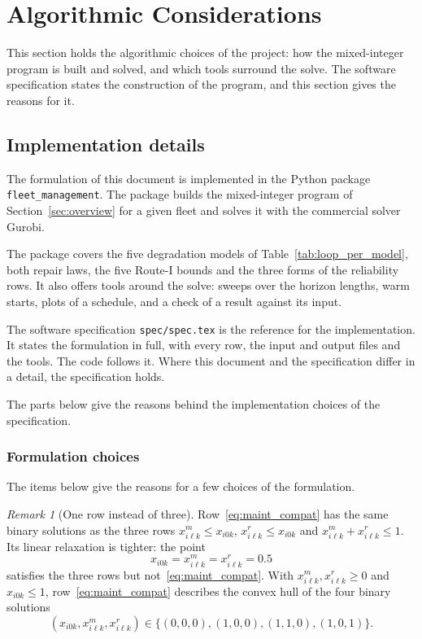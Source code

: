 \documentclass[11pt,a4paper]{article}
\theoremstyle{plain}
\theoremstyle{definition}
\theoremstyle{remark}
\newtheorem{remark}[theorem]{Remark}
\begin{document}
\section{Algorithmic Considerations}\label{sec:algorithmic}

This section holds the algorithmic choices of the project: how the mixed-integer program is built and solved, and which tools surround the solve.
The software specification states the construction of the program, and this section gives the reasons for it.

\subsection{Implementation details}

The formulation of this document is implemented in the Python package \texttt{fleet\_management}.
The package builds the mixed-integer program of Section~\ref{sec:overview} for a given fleet and solves it with the commercial solver Gurobi.

The package covers the five degradation models of Table~\ref{tab:loop_per_model}, both repair laws, the five Route-I bounds and the three forms of the reliability rows.
It also offers tools around the solve: sweeps over the horizon lengths, warm starts, plots of a schedule, and a check of a result against its input.

The software specification \texttt{spec/spec.tex} is the reference for the implementation.
It states the formulation in full, with every row, the input and output files and the tools.
The code follows it.
Where this document and the specification differ in a detail, the specification holds.

The parts below give the reasons behind the implementation choices of the specification.

\subsubsection{Formulation choices}\label{sec:impl_choices}

The items below give the reasons for a few choices of the formulation.

\begin{remark}[One row instead of three]\label{rem:one_depot_row}
Row~\eqref{eq:maint_compat} has the same binary solutions as the three rows $x^m_{i\ell k} \le x_{i0k}$, $x^r_{i\ell k} \le x_{i0k}$ and $x^m_{i\ell k} + x^r_{i\ell k} \le 1$.
Its linear relaxation is tighter: the point
\begin{equation}
  x_{i0k} = x^m_{i\ell k} = x^r_{i\ell k} = 0.5
\end{equation}
satisfies the three rows but not~\eqref{eq:maint_compat}.
With $x^m_{i\ell k}, x^r_{i\ell k} \ge 0$ and $x_{i0k} \le 1$, row~\eqref{eq:maint_compat} describes the convex hull of the four binary solutions
\begin{equation}
  (x_{i0k}, x^m_{i\ell k}, x^r_{i\ell k}) \in \{(0,0,0), (1,0,0), (1,1,0), (1,0,1)\}.
\end{equation}
\end{remark}
\end{document}
